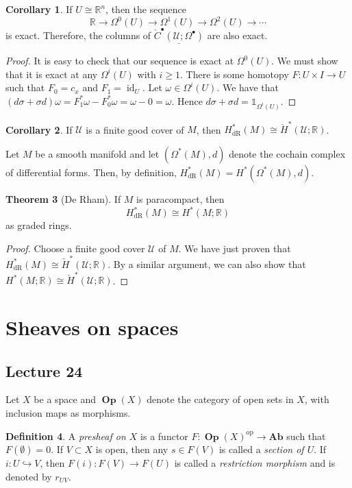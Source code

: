 \documentclass[10pt,letterpaper,cm]{nupset}
\theoremstyle{definition}
\newtheorem{definition}{Definition}[subsection]
\theoremstyle{theorem}
\newtheorem{theorem}[definition]{Theorem}
\newtheorem{corollary}[definition]{Corollary}
\theoremstyle{remark}
\newcommand{\U}{\mathcal U}
\newcommand{\R}{\mathbb{R}}
\newcommand{\1}{\mathbb{1}}
\newcommand{\0}{\vec 0}
\DeclareMathOperator{\id}{id}
\DeclareMathOperator{\dr}{dR}
\DeclareMathOperator{\op}{op}
\DeclareMathOperator{\Op}{\mathbf{Op}}
\begin{document}
\begin{corollary}
If $U \cong \R^n$, then the sequence $$\R \to \Omega^0(U) \to \Omega^1(U) \to \Omega^2(U) \to \cdots$$ is exact. Therefore, the columns of $\underline{\check{C}^{\bullet}(\U; \Omega^{\bullet})}$ are also exact.
\end{corollary}
\begin{proof}
It is easy to check that our sequence is exact at $\Omega^0(U)$. We must show that it is exact at any $\Omega^i(U)$ with $i\geq 1$. There is some homotopy $F: U \times I  \to U$ such that $F_0 = c_x$ and $F_1 = \id_U$.  Let $\omega \in \Omega^i(U)$. We have that $(d \sigma + \sigma d) \omega = F_1^{\ast} \omega - F_0^{\ast} \omega = \omega -0 =\omega$. Hence $d \sigma + \sigma d = \1_{\Omega^i(U)}$.
\end{proof}

\begin{corollary}
 If $\U$ is a finite good cover of $M$, then $H^{\ast}_{\dr}(M) \cong  \check{H}^{\ast}(\U; \R)$.
\end{corollary}

\smallskip

Let $M$ be a smooth manifold and let $\left(\Omega^{\ast}(M), d\right)$ denote the cochain complex of differential forms. Then, by definition, $H_{\dr}^{\ast}(M) = H^{\ast}(\Omega^{\ast}(M), d)$. 

\begin{theorem}[De Rham]
 If $M$ is  paracompact, then $$H^{\ast}_{\dr}(M) \cong H^{\ast}(M; \R)$$ as graded rings.
\end{theorem}
\begin{proof}
Choose a finite good cover $\U$ of $M$. We have just proven that $H^{\ast}_{\dr}(M) \cong  \check{H}^{\ast}(\U; \R)$. By a similar argument, we can also show that $H^{\ast}(M; \R) \cong \check{H}^{\ast}(\U; \R)$.
\end{proof}

\section{Sheaves on spaces}

\subsection{Lecture 24}

Let $X$ be a space and $\Op(X)$ denote the category of open sets in $X$, with inclusion maps as morphisms.

\begin{definition}
 A \textit{presheaf on $X$} is a functor $F: \Op(X)^{\op} \to \mathbf{Ab}$ such that $F(\emptyset) =0$. If $V\subset X$ is open, then any $s\in F(V)$ is called a \textit{section of $U$}. If $i : U \hookrightarrow V$, then $F(i): F(V) \to F(U)$ is called a \textit{restriction morphism} and is denoted by $r_{UV}$. 
\end{definition}
\end{document}
